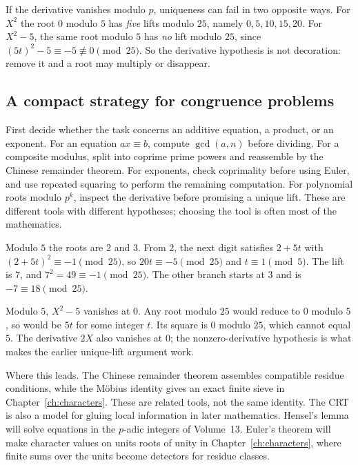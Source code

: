 If the derivative vanishes modulo $p$, uniqueness can fail in two opposite ways. For $X^2$ the root $0$ modulo $5$ has \emph{five} lifts modulo $25$, namely $0,5,10,15,20$. For $X^2-5$, the same root modulo $5$ has \emph{no} lift modulo $25$, since $(5t)^2-5\equiv-5\not\equiv0\pmod{25}$. So the derivative hypothesis is not decoration: remove it and a root may multiply or disappear.

\subsection*{A compact strategy for congruence problems}
First decide whether the task concerns an additive equation, a product, or an exponent. For an equation $ax\equiv b$, compute $\gcd(a,n)$ before dividing. For a composite modulus, split into coprime prime powers and reassemble by the Chinese remainder theorem. For exponents, check coprimality before using Euler, and use repeated squaring to perform the remaining computation. For polynomial roots modulo $p^k$, inspect the derivative before promising a unique lift. These are different tools with different hypotheses; choosing the tool is often most of the mathematics.

\begin{examplex}
Modulo $5$ the roots are $2$ and $3$. From $2$, the next digit satisfies $2+5t$ with $(2+5t)^2\equiv -1\pmod{25}$, so $20t\equiv -5\pmod{25}$ and $t\equiv 1\pmod 5$. The lift is $7$, and $7^2=49\equiv -1\pmod{25}$. The other branch starts at $3$ and is $-7\equiv 18\pmod{25}$.
\end{examplex}

\begin{examplex}
Modulo $5$, $X^2-5$ vanishes at $0$. Any root modulo $25$ would reduce to $0$ modulo $5$, so would be $5t$ for some integer $t$. Its square is $0$ modulo $25$, which cannot equal $5$. The derivative $2X$ also vanishes at $0$; the nonzero-derivative hypothesis is what makes the earlier unique-lift argument work.
\end{examplex}

\begin{beauty}
Where this leads. The Chinese remainder theorem assembles compatible residue conditions, while the M\"obius identity gives an exact finite sieve in Chapter~\ref{ch:characters}. These are related tools, not the same identity. The CRT is also a model for gluing local information in later mathematics. Hensel's lemma will solve equations in the $p$-adic integers of Volume~13. Euler's theorem will make character values on units roots of unity in Chapter~\ref{ch:characters}, where finite sums over the units become detectors for residue classes.
\end{beauty}

